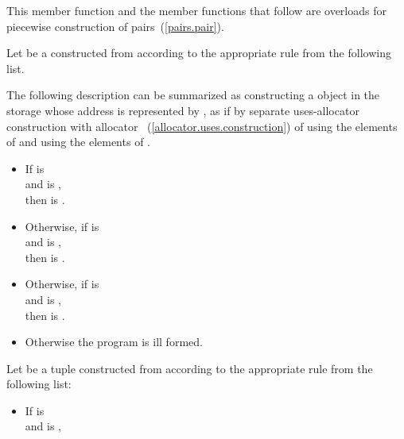 \begin{itemdescr}
\pnum
\begin{note}
This member function and the  member functions that follow
are overloads for piecewise construction of pairs~(\ref{pairs.pair}).
\end{note}

\pnum
\effects
Let  be a  constructed from 
according to the appropriate rule from the following list.
\begin{note}
The following description can be summarized as
constructing a  object
in the storage whose address is represented by ,
as if by separate uses-allocator construction
with allocator ~(\ref{allocator.uses.construction})
of  using the elements of 
and  using the elements of .
\end{note}
\begin{itemize}
\item
If  is 
\\
and
 is ,
\\
then  is .
\item
Otherwise, if  is 
\\
and
 is ,
\\
then  is .
\item
Otherwise, if  is 
\\
and
 is ,
\\
then  is .
\item
Otherwise the program is ill formed.
\end{itemize}
Let  be a tuple constructed from 
according to the appropriate rule from the following list:
\begin{itemize}
\item
If  is 
\\
and
 is ,

\end{itemize}
\end{itemdescr}
